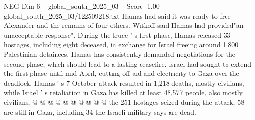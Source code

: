 \begin{textsample}{NEG Dim 6 – global\_south\_2025\_03 – Score -1.00 – global\_south\_2025\_03/122509218.txt}
Hamas had said it was ready to free Alexander and the remains of four others.
Witkoff said Hamas had provided"an unacceptable response".
During the truce ' s first phase, Hamas released 33 hostages, including eight deceased, in exchange for Israel freeing around 1,800 Palestinian detainees.
Hamas has consistently demanded negotiations for the second phase, which should lead to a lasting ceasefire.
Israel had sought to extend the first phase until mid-April, cutting off aid and electricity to Gaza over the deadlock.
Hamas ' s 7 October attack resulted in 1,218 deaths, mostly civilians, while Israel ' s retaliation in Gaza has killed at least 48,577 people, also mostly civilians, @ @ @ @ @ @ @ @ @ @ the 251 hostages seized during the attack, 58 are still in Gaza, including 34 the Israeli military says are dead.

\end{textsample}
